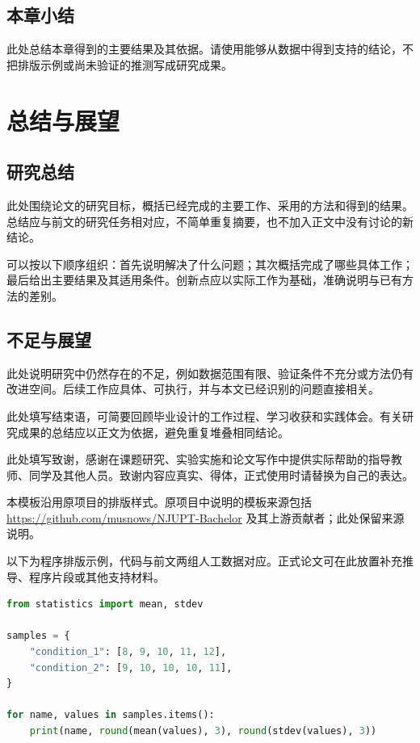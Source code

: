 \documentclass[bachelor]{njupthesis}
\begin{document}
\section{本章小结}
此处总结本章得到的主要结果及其依据。请使用能够从数据中得到支持的结论，不把排版示例或尚未验证的推测写成研究成果。

\chapter{总结与展望}
\label{chap:conclusion}

\section{研究总结}
此处围绕论文的研究目标，概括已经完成的主要工作、采用的方法和得到的结果。总结应与前文的研究任务相对应，不简单重复摘要，也不加入正文中没有讨论的新结论。

可以按以下顺序组织：首先说明解决了什么问题；其次概括完成了哪些具体工作；最后给出主要结果及其适用条件。创新点应以实际工作为基础，准确说明与已有方法的差别。

\section{不足与展望}
此处说明研究中仍然存在的不足，例如数据范围有限、验证条件不充分或方法仍有改进空间。后续工作应具体、可执行，并与本文已经识别的问题直接相关。

\thesisconclusion
此处填写结束语，可简要回顾毕业设计的工作过程、学习收获和实践体会。有关研究成果的总结应以正文为依据，避免重复堆叠相同结论。

\thesisacknowledgement
此处填写致谢，感谢在课题研究、实验实施和论文写作中提供实际帮助的指导教师、同学及其他人员。致谢内容应真实、得体，正式使用时请替换为自己的表达。

本模板沿用原项目的排版样式。原项目中说明的模板来源包括 \url{https://github.com/musnows/NJUPT-Bachelor} 及其上游贡献者；此处保留来源说明。

\begingroup
\thesisreference
\endgroup

\thesisappendix
以下为程序排版示例，代码与前文两组人工数据对应。正式论文可在此放置补充推导、程序片段或其他支持材料。

\begin{lstlisting}[language=Python,caption={演示数据统计程序}]
from statistics import mean, stdev

samples = {
    "condition_1": [8, 9, 10, 11, 12],
    "condition_2": [9, 10, 10, 10, 11],
}

for name, values in samples.items():
    print(name, round(mean(values), 3), round(stdev(values), 3))
\end{lstlisting}
\end{document}
